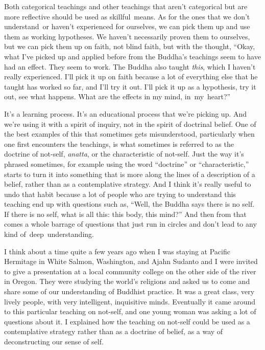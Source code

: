 Both categorical teachings and other teachings that aren't categorical but are more reflective should be used as \mbox{skillful means}. As for the ones that we don't \mbox{understand or} haven't experienced for ourselves, we can pick them up and use them as working hypotheses. We haven't necessarily proven them to ourselves, but we can pick them up on faith, not blind faith, but with the thought, ``Okay, what I've picked up and applied before from the Buddha's teachings seem to have had an effect. They seem to work. The Buddha also taught \emph{this}, which I haven't really experienced. I'll pick it up on faith because a lot of everything else that he taught has worked so far, and I'll try it out. I'll pick it up as a hypothesis, try it out, see what happens. What are the effects in my mind, \mbox{in my heart?''}

It's a learning process. It's an educational process that we're picking up. And we're using it with a spirit of inquiry, not in the spirit of doctrinal belief. One of the best examples of this that sometimes gets misunderstood, particularly when one first encounters the teachings, is what sometimes is referred to as the doctrine of not-self, \emph{anatta}, or the characteristic of not-self. Just the way it's phrased sometimes, for example using the word ``doctrine'' or ``characteristic,'' starts to turn it into something that is more along the lines of a description of a belief, rather than as a contemplative strategy. And I think it's really useful to undo that habit because a lot of people who are trying to understand this teaching end up with questions such as, ``Well, the Buddha says there is no self. If there is no self, what is all this: this body, this mind?'' And then from that comes a whole barrage of questions that just run in circles and don't lead to any kind \mbox{of deep understanding.}

I think about a time quite a few years ago when I was staying at Pacific Hermitage in White Salmon, Washington, and Ajahn Sudanto and I were invited to give a presentation at a local community college on the other side of the river in Oregon. They were studying the world's religions and asked us to come and share some of our understanding of Buddhist practice. It was a great class, very lively people, with very intelligent, inquisitive minds. Eventually it came around to this particular teaching on not-self, and one young woman was asking a lot of questions about it. I explained how the teaching on not-self could be used as a contemplative strategy rather than as a doctrine of belief, as a way of deconstructing our sense of self.

